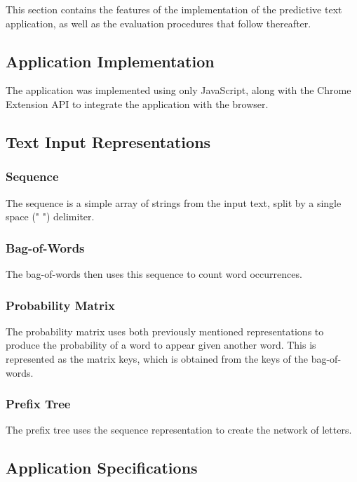 \documentclass[journal]{./IEEE/IEEEtran}
\begin{document}


This section contains the features of the implementation of the predictive text application, as well as the evaluation procedures that follow thereafter.

\subsection{Application Implementation}
The application was implemented using only JavaScript, along with the Chrome Extension API to integrate the application with the browser.

\subsection{Text Input Representations}
\subsubsection{Sequence}
The sequence is a simple array of strings from the input text, split by a single space (" ") delimiter.

\subsubsection{Bag-of-Words}
The bag-of-words then uses this sequence to count word occurrences.

\subsubsection{Probability Matrix}
The probability matrix uses both previously mentioned representations to produce the probability of a word to appear given another word. This is represented as the matrix keys, which is obtained from the keys of the bag-of-words.

\subsubsection{Prefix Tree}
The prefix tree uses the sequence representation to create the network of letters.

\subsection{Application Specifications}
\end{document}
